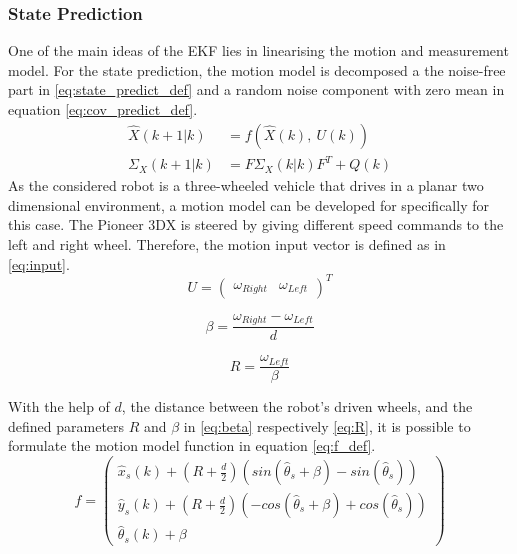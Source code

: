 \subsubsection{State Prediction}
\label{subsubsec:State_Prediction}
One of the main ideas of the EKF lies in linearising the motion and measurement model.
For the state prediction, the motion model is decomposed a the noise-free part in  \eqref{eq:state_predict_def} and a random noise component with zero mean in equation \eqref{eq:cov_predict_def}.
\begin{align}
\hat{X}(k+1|k) &= f(\hat{X}(k),~U(k)) \label{eq:state_predict_def} \\
\Sigma_{X}(k+1|k) &= F \Sigma_{X}(k|k) F^{T} + Q(k) \label{eq:cov_predict_def} 
\end{align}
As the considered robot is a three-wheeled vehicle that drives in a planar two dimensional environment, a motion model can be developed for specifically for this case. The Pioneer 3DX is steered by giving different speed commands to the left and right wheel. Therefore, the motion input vector is defined as in \eqref{eq:input}.
\begin{equation}
U=\begin{pmatrix}\omega_{Right} & \omega_{Left} \end{pmatrix}^T \label{eq:input}
\end{equation}
\noindent\begin{minipage}{.53\linewidth}
\centering
\begin{equation}
\beta=\frac{\omega_{Right}-\omega_{Left}}{d} \label{eq:beta}
\end{equation}
\end{minipage}%
\begin{minipage}{.38\linewidth}
\centering
\begin{equation}
R=\frac{\omega_{Left}}{\beta} \label{eq:R}
\end{equation}
\end{minipage}

With the help of $d$, the distance between the robot's driven wheels, and the defined parameters $R$ and $\beta$ in \eqref{eq:beta} respectively \eqref{eq:R}, it is possible to formulate the motion model function in equation \eqref{eq:f_def}.
\begin{equation}
f = \begin{pmatrix} \hat{x}_s(k) + (R+\frac{d}{2})(sin(\hat{\theta}_s+ \beta)-sin(\hat{\theta}_s)) \\ \hat{y}_s(k) + (R+{\frac{d}{2}})(-cos(\hat{\theta}_s+ \beta)+cos(\hat{\theta}_s)) \\ \hat{\theta}_s(k) + \beta\end{pmatrix}
\label{eq:f_def}
\end{equation}

